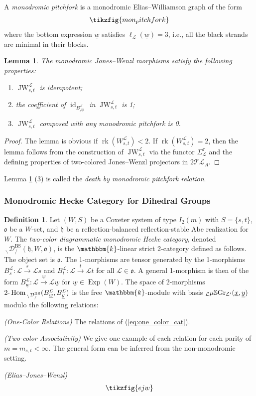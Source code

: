 \documentclass{amsart}
\renewcommand{\k}{\mathbbm{k}}
\newcommand{\scrL}{\mathcal{L}}
\DeclareMathOperator{\Hom}{Hom}
\newcommand{\TwoHom}{2\textnormal{-}\Hom}
\DeclareMathOperator{\id}{id}
\DeclareMathOperator{\rk}{rk}
\newcommand{\fr}[1]{\mathfrak{#1}}
\DeclareMathOperator{\BS}{BS}
\newcommand{\TLcat}{2\mathcal{T}\mathcal{L}}
\DeclareMathOperator{\JW}{JW}
\newcommand{\EWmon}[2]{\:_{#1 \backslash} \mathcal{D}_{/ #2} }
\DeclareMathOperator{\Exp}{Exp}
\newcommand{\VSGraph}{\mu\mathbb{S}\textnormal{Gr}}
\newcommand{\uw}{\underline{w}}
\newcommand{\ux}{\underline{x}}
\newcommand{\uy}{\underline{y}}
\newtheorem{lemma}[subsubsection]{Lemma}
\theoremstyle{definition}
\newtheorem{definition}[subsubsection]{Definition}
\numberwithin{equation}{subsection}
\begin{document}
A \emph{monodromic pitchfork} is a monodromic Elias--Williamson graph of the form
\[\tikzfig{mon_pitchfork}\]
where the bottom expression $\uw$ satisfies $\ell_{\scrL} (\uw) = 3$, i.e., all the black strands are minimal in their blocks.

\begin{lemma}\label{lem:mon_JW_properties}
    The monodromic Jones--Wenzl morphisms satisfy the following properties:
    \begin{enumerate}
        \item $\JW_{s,t}^{\scrL}$ is idempotent;
        \item the coefficient of $\id_{B_{{}_s \underline{m}}^{\scrL}}$ in $\JW_{s,t}^{\scrL}$ is 1;
        \item $\JW_{s,t}^{\scrL}$ composed with any monodromic pitchfork is 0.
    \end{enumerate}
\end{lemma}
\begin{proof}
    The lemma is obvious if $\rk (W_{s,t}^{\scrL}) < 2$.
    If $\rk (W_{s,t}^{\scrL}) = 2$, then the lemma follows from the construction of $\JW_{s,t}^{\scrL}$ via the functor $\Sigma_{\scrL}^{\tau}$ and the defining properties of two-colored Jones--Wenzl projectors in $\TLcat_A$.  
\end{proof}

Lemma \ref{lem:mon_JW_properties} (3) is called the \emph{death by monodromic pitchfork relation}.

\subsubsection{Monodromic Hecke Category for Dihedral Groups}

\begin{definition}\label{def:two_color_cat}
Let $(W,S)$ be a Coxeter system of type $I_2 (m)$ with $S = \{s, t\}$, $\fr{o}$ be a $W$-set, and $\fr{h}$ be a reflection-balanced reflection-stable  Abe realization for $W$.
The \emph{two-color diagrammatic monodromic Hecke category}, denoted $\EWmon{}{}^{\BS} (\fr{h}, W, \fr{o})$, is the $\k$-linear strict 2-category defined as follows.
The object set is $\fr{o}$. The 1-morphisms are tensor generated by the 1-morphisms $B_s^{\scrL} : \scrL \stackrel{s}{\to} \scrL s$ and $B_t^{\scrL} : \scrL \stackrel{t}{\to} \scrL t$ for all $\scrL \in \fr{o}$.
A general 1-morphism is then of the form $B_{\uw}^{\scrL} : \scrL \stackrel{\uw}{\to} \scrL \uw$ for $\uw \in \Exp (W)$. 
The space of 2-morphisms $\TwoHom_{\EWmon{}{}^{\BS}} (B_{\uw}^{\scrL}, B_{\uy}^{\scrL})$ is the free $\k$-module with basis ${}_{\scrL} \VSGraph_{\scrL'} (\ux, \uy)$ modulo the following relations:

    \emph{(One-Color Relations)} The relations of (\ref{eq:one_color_cat}).
   
    \emph{(Two-color Associativity)} We give one example of each relation for each parity of $m = m_{s,t} < \infty$. The general form can be inferred from the non-monodromic setting.

    \emph{(Elias--Jones--Wenzl)}
        \[\tikzfig{ejw}\]
\end{definition}
\end{document}
